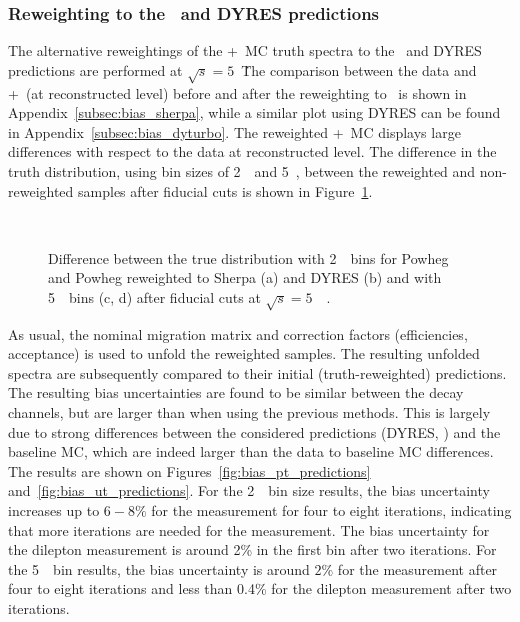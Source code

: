 \subsubsection{Reweighting to the \SHERPA\ and DYRES predictions}
The alternative reweightings of the \POWHEG+\PYTHIA\ MC truth spectra to the \SHERPA\ and DYRES predictions are performed at $\sqrt{s} = 5$~\TeV\. The comparison between the data and \POWHEG+\PYTHIA\ (at reconstructed level) before and after the reweighting to \SHERPA\ is shown in Appendix~\ref{subsec:bias_sherpa}, while a similar plot using DYRES can be found in Appendix~\ref{subsec:bias_dyturbo}. The reweighted \POWHEG+\PYTHIA\ MC displays large differences with respect to the data at reconstructed level.
The difference in the truth \ptz distribution, using bin sizes of 2~\GeV\ and 5~\GeV, between the reweighted and non-reweighted samples after fiducial cuts is shown in Figure~\ref{fig:truth_fid}.

\begin{figure}[h]
\centering
{}
\\
\caption{Difference between the true \ptz distribution with 2~\GeV\ bins for Powheg and Powheg reweighted to Sherpa (a) and DYRES (b) and with 5~\GeV\ bins (c, d) after fiducial cuts at $\sqrt{s} = 5$~\TeV\ . }
\label{fig:truth_fid}
\end{figure}

As usual, the nominal migration matrix and correction factors (efficiencies, acceptance) is used to unfold the reweighted samples. The resulting unfolded spectra are subsequently compared to their initial (truth-reweighted) predictions.
The resulting bias uncertainties are found to be similar between the decay channels, but are larger than when using the previous methods. This is largely due to strong differences between the considered predictions (DYRES, \SHERPA) and the baseline MC, which are indeed larger than the data to baseline MC differences. The results are shown on Figures~\ref{fig:bias_pt_predictions} and~\ref{fig:bias_ut_predictions}.
For the 2~\GeV\ bin size results, the bias uncertainty increases up to $6-8\%$ for the \ut measurement for four to eight iterations, indicating that more iterations are needed for the measurement. The bias uncertainty for the dilepton \pt measurement is around 2\% in the first bin after two iterations. For the 5~\GeV\ bin results, the bias uncertainty is around $2\%$ for the \ut measurement after four to eight iterations and less than 0.4\% for the dilepton \pt measurement after two iterations.

